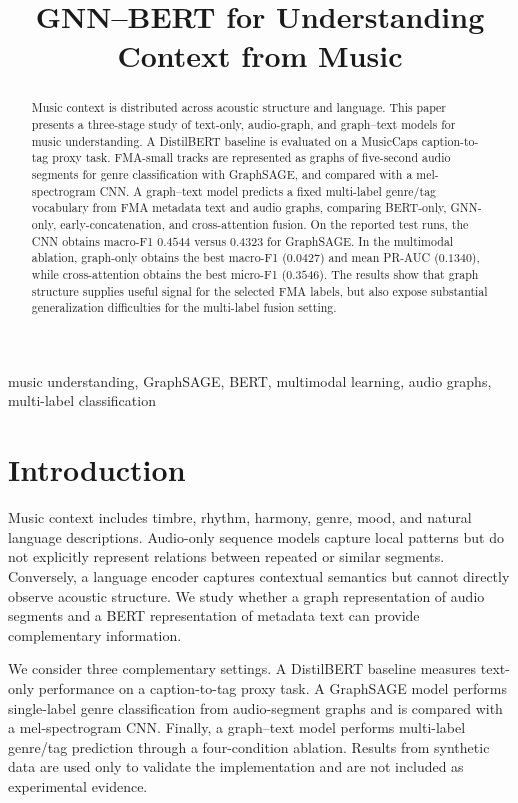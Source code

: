 \documentclass[conference]{IEEEtran}
\title{GNN--BERT for Understanding Context from Music}
\author{\IEEEauthorblockN{Moin Mostakim}
\IEEEauthorblockA{Department of Computer Science and Engineering\\
Course: Neural Networks (CSE425 / EEE474 / CSE715)\\
Email: \textit{[add institutional email]}}}
\begin{document}
\maketitle

\begin{abstract}
Music context is distributed across acoustic structure and language. This
paper presents a three-stage study of text-only, audio-graph, and graph--text
models for music understanding. A DistilBERT baseline is evaluated on a
MusicCaps caption-to-tag proxy task. FMA-small tracks are represented as
graphs of five-second audio segments for genre classification with GraphSAGE,
and compared with a mel-spectrogram CNN. A graph--text model predicts a fixed
multi-label genre/tag
vocabulary from FMA metadata text and audio graphs, comparing BERT-only,
GNN-only, early-concatenation, and cross-attention fusion. On the reported
test runs, the CNN obtains macro-F1 $0.4544$ versus $0.4323$ for
GraphSAGE. In the multimodal ablation, graph-only obtains the best macro-F1
($0.0427$) and
mean PR-AUC ($0.1340$), while cross-attention obtains the best micro-F1
($0.3546$). The results show that graph structure supplies useful signal for
the selected FMA labels, but also expose substantial generalization
difficulties for the multi-label fusion setting.
\end{abstract}

\begin{IEEEkeywords}
music understanding, GraphSAGE, BERT, multimodal learning, audio graphs,
multi-label classification
\end{IEEEkeywords}

\section{Introduction}
Music context includes timbre, rhythm, harmony, genre, mood, and natural
language descriptions. Audio-only sequence models capture local patterns but
do not explicitly represent relations between repeated or similar segments.
Conversely, a language encoder captures contextual semantics but cannot
directly observe acoustic structure. We study whether a graph representation
of audio segments and a BERT representation of metadata text can provide
complementary information.

We consider three complementary settings. A DistilBERT baseline measures
text-only performance on a caption-to-tag proxy task. A GraphSAGE model
performs single-label genre classification from audio-segment graphs and is
compared with a mel-spectrogram CNN. Finally, a graph--text model performs
multi-label genre/tag prediction through a four-condition ablation. Results
from synthetic data are used only to validate the implementation and are not
included as experimental evidence.
\end{document}

